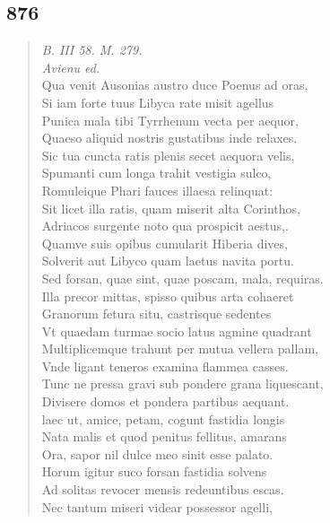 \documentclass[11pt, a4paper]{report}
\begin{document}
            \subsection*{876}
      \begin{verse}
      \textit{B. III 58. M. 279.} \\ \textit{Avienu ed.} \\ Qua venit Ausonias austro duce Poenus ad oras, \\ Si iam forte tuus Libyca rate misit agellus \\ Punica mala tibi Tyrrhenum vecta per aequor, \\ Quaeso aliquid nostris gustatibus inde relaxes. \\ Sic tua cuncta ratis plenis secet aequora velis, \\ Spumanti cum longa trahit vestigia sulco, \\ Romuleique Phari fauces illaesa relinquat: \\ Sit licet illa ratis, quam miserit alta Corinthos, \\ Adriacos surgente noto qua prospicit aestus,. \\ Quamve suis opibus cumularit Hiberia dives, \\ Solverit aut Libyco quam laetus navita portu. \\ Sed forsan, quae sint, quae poscam, mala, requiras. \\ Illa precor mittas, spisso quibus arta cohaeret \\ Granorum fetura situ, castrisque sedentes \\ Vt quaedam turmae socio latus agmine quadrant \\ Multiplicemque trahunt per mutua vellera pallam, \\ Vnde ligant teneros examina flammea casses. \\ Tunc ne pressa gravi sub pondere grana liquescant, \\ Divisere domos et pondera partibus aequant. \\ laec ut, amice, petam, cogunt fastidia longis \\ Nata malis et quod penitus fellitus, amarans \\ Ora, sapor nil dulce meo sinit esse palato. \\ Horum igitur suco forsan fastidia solvens \\ Ad solitas revocer mensis redeuntibus escas. \\ Nec tantum miseri videar possessor agelli, \\ 

\end{verse}
\end{document}
